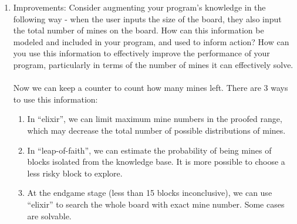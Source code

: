 \documentclass[letter]{article}
\begin{document}
\begin{enumerate}
	\item {Improvements: Consider augmenting your program’s knowledge in the following way - when the user inputs the size of the board, they also input the total number of mines on the board. How can this information be modeled and included in your program, and used to inform action? How can you use this information to effectively improve the performance of your program, particularly in terms of the number of mines it can effectively solve.} \\
	\\
	Now we can keep a counter to count how many mines left.
	There are 3 ways to use this information:
	\begin{enumerate}
		\item {In ``elixir'', we can limit maximum mine numbers in the proofed range, which may decrease the total number of possible distributions of mines.}
		\item {In ``leap-of-faith'', we can estimate the probability of being mines of blocks isolated from the knowledge base. It is more possible to choose a less risky block to explore.}
		\item {At the endgame stage (less than 15 blocks inconclusive), we can use ``elixir'' to search the whole board with exact mine number. Some cases are solvable.}
	\end{enumerate}

\end{enumerate}
\end{document}
